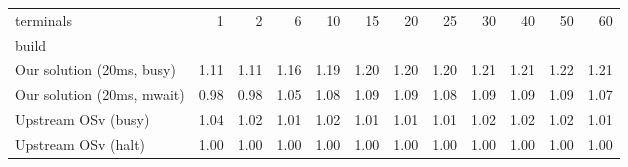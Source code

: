 \begin{tabular}{lrrrrrrrrrrr}
\toprule
terminals &    1  &    2  &    6  &    10 &    15 &    20 &    25 &    30 &    40 &    50 &    60 \\
build                      &       &       &       &       &       &       &       &       &       &       &       \\
\midrule
Our solution (20ms, busy)  &  1.11 &  1.11 &  1.16 &  1.19 &  1.20 &  1.20 &  1.20 &  1.21 &  1.21 &  1.22 &  1.21 \\
Our solution (20ms, mwait) &  0.98 &  0.98 &  1.05 &  1.08 &  1.09 &  1.09 &  1.08 &  1.09 &  1.09 &  1.09 &  1.07 \\
Upstream OSv (busy)        &  1.04 &  1.02 &  1.01 &  1.02 &  1.01 &  1.01 &  1.01 &  1.02 &  1.02 &  1.02 &  1.01 \\
Upstream OSv (halt)        &  1.00 &  1.00 &  1.00 &  1.00 &  1.00 &  1.00 &  1.00 &  1.00 &  1.00 &  1.00 &  1.00 \\
\bottomrule
\end{tabular}
